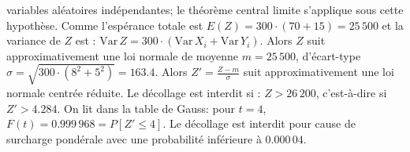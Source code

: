 {\begin{enumerate}
{variables aléatoires indépendantes; le théorème central
limite s'applique sous cette hypothèse.
Comme l'espérance totale est $E(Z)=300 \cdot (70+15)=25\,500$ et la variance
de $Z$ est :
$\text{Var}\, Z=300 \cdot(\text{Var}\,X_{i}+\text{Var}\,Y_{i})$.
 Alors $Z$ suit approximativement une loi
normale de moyenne $m=25\,500$, d'écart-type $\sigma =\sqrt{300\cdot(8^{2}+5^{2})}=163.4$.
Alors $Z' =\frac{Z-m}{\sigma}$ suit approximativement une loi normale
centrée réduite.
Le décollage est interdit si : $Z>26\,200$, c'est-à-dire si  $Z' >4.284$.
On lit dans la table de Gauss: pour $t=4$, $F(t)=0.999\,968=P[Z' \leq 4]$.
Le décollage est interdit pour cause de surcharge pondérale avec une
probabilité inférieure à $0.000\,04$.
}
\end{enumerate}
}
